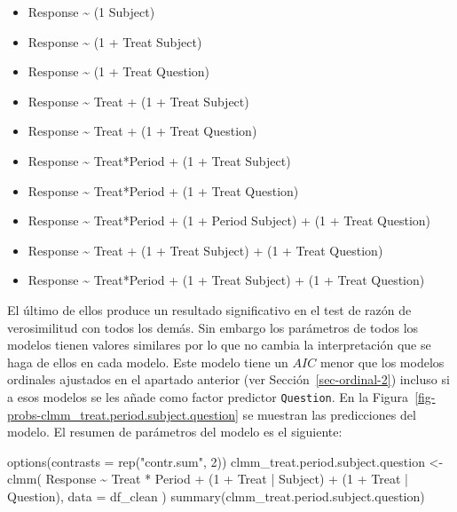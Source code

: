 \documentclass[
  12pt,
  a4paper,
  extrafontsizes,
  onecolumn,
  openright,
  table]{memoir}
\newenvironment{Shaded}{\begin{snugshade}}{\end{snugshade}}
\newcommand{\AttributeTok}[1]{\textcolor[rgb]{0.40,0.45,0.13}{#1}}
\newcommand{\DecValTok}[1]{\textcolor[rgb]{0.68,0.00,0.00}{#1}}
\newcommand{\FunctionTok}[1]{\textcolor[rgb]{0.28,0.35,0.67}{#1}}
\newcommand{\NormalTok}[1]{\textcolor[rgb]{0.00,0.23,0.31}{#1}}
\newcommand{\OtherTok}[1]{\textcolor[rgb]{0.00,0.23,0.31}{#1}}
\newcommand{\SpecialCharTok}[1]{\textcolor[rgb]{0.37,0.37,0.37}{#1}}
\newcommand{\StringTok}[1]{\textcolor[rgb]{0.13,0.47,0.30}{#1}}
\providecommand{\tightlist}{%
  \setlength{\itemsep}{0pt}\setlength{\parskip}{0pt}}\usepackage{longtable,booktabs,array}
\begin{document}
\begin{itemize}
\tightlist
\item
  Response \textasciitilde{} (1 \textbar{} Subject)
\item
  Response \textasciitilde{} (1 + Treat \textbar{} Subject)
\item
  Response \textasciitilde{} (1 + Treat \textbar{} Question)
\item
  Response \textasciitilde{} Treat + (1 + Treat \textbar{} Subject)
\item
  Response \textasciitilde{} Treat + (1 + Treat \textbar{} Question)
\item
  Response \textasciitilde{} Treat*Period + (1 + Treat \textbar{}
  Subject)
\item
  Response \textasciitilde{} Treat*Period + (1 + Treat \textbar{}
  Question)
\item
  Response \textasciitilde{} Treat*Period + (1 + Period \textbar{}
  Subject) + (1 + Treat \textbar{} Question)
\item
  Response \textasciitilde{} Treat + (1 + Treat \textbar{} Subject) + (1
  + Treat \textbar{} Question)
\item
  Response \textasciitilde{} Treat*Period + (1 + Treat \textbar{}
  Subject) + (1 + Treat \textbar{} Question)
\end{itemize}

El último de ellos produce un resultado significativo en el test de
razón de verosimilitud con todos los demás. Sin embargo los parámetros
de todos los modelos tienen valores similares por lo que no cambia la
interpretación que se haga de ellos en cada modelo. Este modelo tiene un
\(AIC\) menor que los modelos ordinales ajustados en el apartado
anterior (ver Sección~\ref{sec-ordinal-2}) incluso si a esos modelos se
les añade como factor predictor \texttt{Question}. En la
Figura~\ref{fig-probs-clmm_treat.period.subject.question} se muestran
las predicciones del modelo. El resumen de parámetros del modelo es el
siguiente:

\scriptsize

\begin{Shaded}
\begin{Highlighting}[]
\FunctionTok{options}\NormalTok{(}\AttributeTok{contrasts =} \FunctionTok{rep}\NormalTok{(}\StringTok{"contr.sum"}\NormalTok{, }\DecValTok{2}\NormalTok{))}
\NormalTok{clmm\_treat.period.subject.question }\OtherTok{\textless{}{-}} \FunctionTok{clmm}\NormalTok{(}
\NormalTok{    Response }\SpecialCharTok{\textasciitilde{}}\NormalTok{ Treat }\SpecialCharTok{*}\NormalTok{ Period }\SpecialCharTok{+}\NormalTok{ (}\DecValTok{1} \SpecialCharTok{+}\NormalTok{ Treat }\SpecialCharTok{|}\NormalTok{ Subject) }\SpecialCharTok{+}\NormalTok{ (}\DecValTok{1} \SpecialCharTok{+}\NormalTok{ Treat }\SpecialCharTok{|}\NormalTok{ Question),}
    \AttributeTok{data =}\NormalTok{ df\_clean}
\NormalTok{)}
\FunctionTok{summary}\NormalTok{(clmm\_treat.period.subject.question)}
\end{Highlighting}
\end{Shaded}
\end{document}
